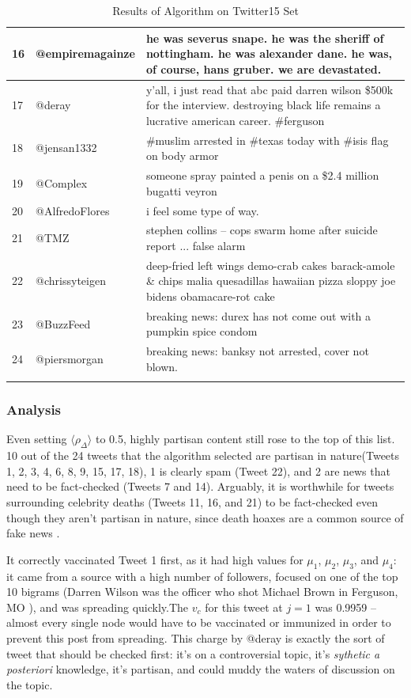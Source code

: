 \documentclass[preprint,review,12pt]{elsarticle}
\begin{document}
\begin{longtable}{ |p{0.5cm}|p{4.1cm}|p{12cm}|  }
\hline
16 & @empiremagainze & he was severus snape. he was the sheriff of nottingham. he was alexander dane. he was, of course, hans gruber. we are devastated. \\
\hline
17 & @deray & y'all, i just read that abc paid darren wilson \$500k for the interview. destroying black life remains a lucrative american career. \#ferguson \\
\hline
18 & @jensan1332 & \#muslim arrested in \#texas today with \#isis flag on body armor \\
\hline
19 & @Complex & someone spray painted a penis on a \$2.4 million bugatti veyron \\
\hline
20 &@AlfredoFlores & i feel some type of way. \\
\hline
21 & @TMZ & stephen collins -- cops swarm home after suicide report ... false alarm \\
\hline
22 & @chrissyteigen & deep-fried left wings demo-crab cakes barack-amole \& chips malia quesadillas hawaiian pizza sloppy joe bidens obamacare-rot cake \\
\hline
23 & @BuzzFeed & breaking news: durex has not come out with a pumpkin spice condom \\
\hline
24 & @piersmorgan& breaking news: banksy not arrested, cover not blown. \\

\hline
\caption{Results of Algorithm on Twitter15 Set}
\label{Results of Algorithm Twitter15}
\end{longtable}

\subsubsection{Analysis}
Even setting $\langle \rho_{\Delta} \rangle$ to 0.5, highly partisan content still rose to the top of this list. 10 out of the 24 tweets that the algorithm selected are partisan in nature(Tweets 1, 2, 3, 4, 6, 8, 9, 15, 17, 18), 1 is clearly spam (Tweet 22), and 2 are news that need to be fact-checked (Tweets 7 and 14). Arguably, it is worthwhile for tweets surrounding celebrity deaths (Tweets 11, 16, and 21) to be fact-checked even though they aren't partisan in nature, since death hoaxes are a common source of fake news \cite{moses2017celebrity}.

It correctly vaccinated Tweet 1 first, as it had high values for $\mu_1$, $\mu_2$, $\mu_3$, and $\mu_4$: it came from a source with a high number of followers, focused on one of the top 10 bigrams (Darren Wilson was the officer who shot Michael Brown in Ferguson, MO \cite{halpern2015cop}), and was spreading quickly.The $v_c$ for this tweet at $j=1$ was 0.9959 -- almost every single node would have to be vaccinated or immunized in order to prevent this post from spreading. This charge by @deray is exactly the sort of tweet that should be checked first: it's on a controversial topic, it's \textit{sythetic a posteriori} knowledge, it's partisan, and could muddy the waters of discussion on the topic. 
\end{document}
